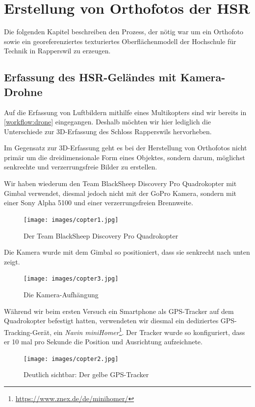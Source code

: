 \chapter{Erstellung von Orthofotos der HSR}


Die folgenden Kapitel beschreiben den Prozess, der nötig war um ein Orthofoto
sowie ein georeferenziertes texturiertes Oberflächenmodell der Hochschule für
Technik in Rapperswil zu erzeugen.


\section{Erfassung des HSR-Geländes mit Kamera-Drohne}

Auf die Erfassung von Luftbildern mithilfe eines Multikopters sind wir bereits
in \autoref{workflow:drone} eingegangen. Deshalb möchten wir hier lediglich die
Unterschiede zur 3D-Erfassung des Schloss Rapperswils hervorheben.

Im Gegensatz zur 3D-Erfassung geht es bei der Herstellung von Orthofotos nicht
primär um die dreidimensionale Form eines Objektes, sondern darum, möglichst
senkrechte und verzerrungsfreie Bilder zu erstellen.

Wir haben wiederum den Team BlackSheep Discovery Pro Quadrokopter mit Gimbal
verwendet, diesmal jedoch nicht mit der GoPro Kamera, sondern mit einer Sony
Alpha 5100 und einer verzerrungsfreien Brennweite.
\begin{figure}[H]
	\centering
	\texttt{[image: images/copter1.jpg]}
	\caption{Der Team BlackSheep Discovery Pro Quadrokopter}
	\label{img:copter1}
\end{figure}

\noindent Die Kamera wurde mit dem Gimbal so positioniert, dass sie senkrecht
nach unten zeigt.
\begin{figure}[H]
	\centering
	\texttt{[image: images/copter3.jpg]}
	\caption{Die Kamera-Aufhängung}
	\label{img:copter3}
\end{figure}

\noindent Während wir beim ersten Versuch ein Smartphone als GPS-Tracker auf dem
Quadrokopter befestigt hatten, verwendeten wir diesmal ein dediziertes
GPS-Tracking-Gerät, ein \textit{Navin
miniHomer}\footnote{\url{https://www.znex.de/de/minihomer/}}. Der Tracker wurde
so konfiguriert, dass er 10 mal pro Sekunde die Position und Ausrichtung
aufzeichnete.
\begin{figure}[H]
	\centering
	\texttt{[image: images/copter2.jpg]}
	\caption{Deutlich sichtbar: Der gelbe GPS-Tracker}
	\label{img:copter2}
\end{figure}

